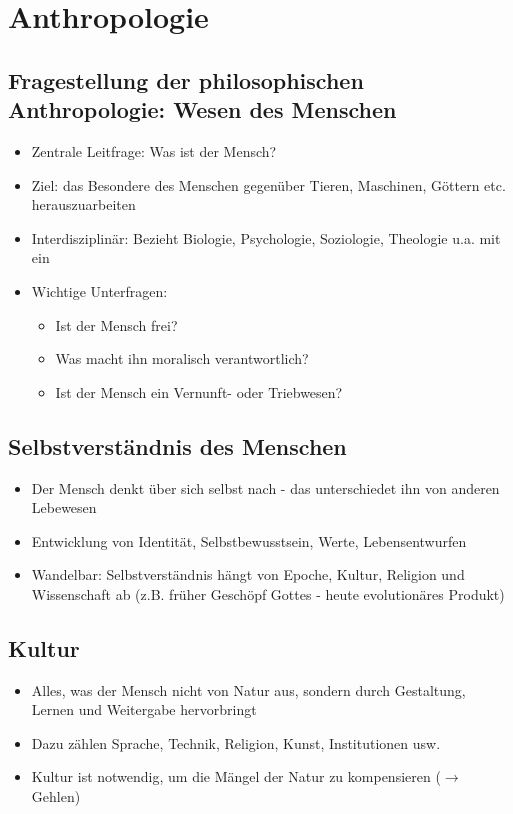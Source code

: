 
\section{Anthropologie}


\subsection{Fragestellung der philosophischen Anthropologie: Wesen des Menschen}
\begin{itemize}
    \item Zentrale Leitfrage: Was ist der Mensch?
    \item Ziel: das Besondere des Menschen gegenüber Tieren, Maschinen, Göttern etc. herauszuarbeiten
    \item Interdisziplinär: Bezieht Biologie, Psychologie, Soziologie, Theologie u.a. mit ein 
    \item Wichtige Unterfragen:
    \begin{itemize}
        \item Ist der Mensch frei?
        \item Was macht ihn moralisch verantwortlich?
        \item Ist der Mensch ein Vernunft- oder Triebwesen?
    \end{itemize}
\end{itemize}

\subsection{Selbstverständnis des Menschen}
\begin{itemize}
    \item Der Mensch denkt über sich selbst nach - das unterschiedet ihn von anderen Lebewesen
    \item Entwicklung von Identität, Selbstbewusstsein, Werte, Lebensentwurfen
    \item Wandelbar: Selbstverständnis hängt von Epoche, Kultur, Religion und Wissenschaft ab (z.B. früher Geschöpf Gottes - heute evolutionäres Produkt)
\end{itemize}

\subsection{Kultur}
\begin{itemize}
    \item Alles, was der Mensch nicht von Natur aus, sondern durch Gestaltung, Lernen und Weitergabe hervorbringt
    \item Dazu zählen Sprache, Technik, Religion, Kunst, Institutionen usw.
    \item Kultur ist notwendig, um die Mängel der Natur zu kompensieren ($\rightarrow$ Gehlen)
\end{itemize}


